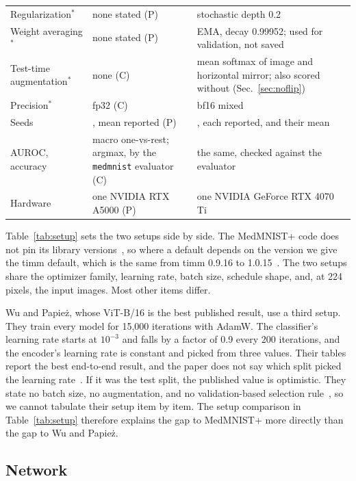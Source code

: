 \documentclass[conference]{IEEEtran}
\newif\ifanycitation
\let\citeAnyKey\cite
\renewcommand{\cite}{\global\anycitationtrue\citeAnyKey}
\begin{document}
\begin{table}[t]
\begin{tabular}{@{}l>{\raggedright\arraybackslash}p{}>{\raggedright\arraybackslash}p{}@{}}
Regularization$^\ast$ & none stated (P) & stochastic depth 0.2 \\
Weight averaging$^\ast$ & none stated (P) & EMA, decay 0.99952; used for validation, not saved \\
Test-time augmentation$^\ast$ & none (C) & mean softmax of image and horizontal mirror; also scored without (Sec.~\ref{sec:noflip}) \\
Precision$^\ast$ & fp32 (C) & bf16 mixed \\
Seeds & 3, mean reported (P) & 3, each reported, and their mean \\
AUROC, accuracy & macro one-vs-rest; argmax, by the \texttt{medmnist} evaluator (C) & the same, checked against the evaluator \\
Hardware & one NVIDIA RTX A5000 (P) & one NVIDIA GeForce RTX 4070 Ti \\
\bottomrule
\end{tabular}
\end{table}

Table~\ref{tab:setup} sets the two setups side by side. The MedMNIST+ code does not pin
its library versions~\cite{doerrich2025medmnistpluscode}, so where a default depends on
the version we give the timm default, which is the same from timm 0.9.16 to
1.0.15~\cite{wightman2024timm103}. The two setups share the optimizer family, learning
rate, batch size, schedule shape, and, at 224 pixels, the input images. Most other items
differ.

Wu and Papie\.{z}, whose ViT-B/16 is the best published result, use a third setup. They
train every model for 15,000 iterations with AdamW. The classifier's learning rate starts
at $10^{-3}$ and falls by a factor of 0.9 every 200 iterations, and the encoder's learning
rate is constant and picked from three values. Their tables report the best end-to-end
result, and the paper does not say which split picked the learning
rate~\cite{wu2025rethinking}. If it was the test split, the published value is
optimistic. They state no batch size, no augmentation, and no validation-based selection
rule~\cite{wu2025rethinking}, so we cannot tabulate their setup item by item. The setup
comparison in Table~\ref{tab:setup} therefore explains the gap to MedMNIST+ more directly
than the gap to Wu and Papie\.{z}.

\subsection{Network}
\end{document}
